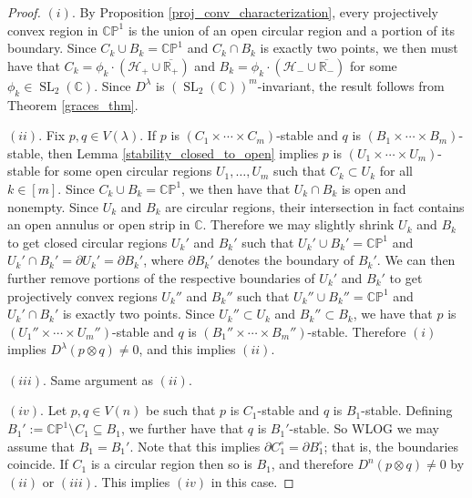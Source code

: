 \documentclass{article}
\theoremstyle{definition}
\theoremstyle{plain}
\newcommand{\C}{\mathbb{C}}
\newcommand{\R}{\mathbb{R}}
\newcommand{\CP}{\mathbb{CP}}
\newcommand{\UHP}{\mathcal{H}_+}
\newcommand{\LHP}{\mathcal{H}_-}
\DeclareMathOperator{\SL}{SL}
\begin{document}
\begin{proof}
    $(i)$. By Proposition \ref{proj_conv_characterization}, every projectively convex region in $\CP^1$ is the union of an open circular region and a portion of its boundary. Since $C_k \cup B_k = \CP^1$ and $C_k \cap B_k$ is exactly two points, we then must have that $C_k = \phi_k \cdot (\UHP \cup \overline{\R_+})$ and $B_k = \phi_k \cdot (\LHP \cup \overline{\R_-})$ for some $\phi_k \in \SL_2(\C)$. Since $D^\lambda$ is $(\SL_2(\C))^m$-invariant, the result follows from Theorem \ref{graces_thm}.
    
    $(ii)$. Fix $p,q \in V(\lambda)$. If $p$ is $(C_1 \times \cdots \times C_m)$-stable and $q$ is $(B_1 \times \cdots \times B_m)$-stable, then Lemma \ref{stability_closed_to_open} implies $p$ is $(U_1 \times \cdots \times U_m)$-stable for some open circular regions $U_1,\ldots,U_m$ such that $C_k \subset U_k$ for all $k \in [m]$. Since $C_k \cup B_k = \CP^1$, we then have that $U_k \cap B_k$ is open and nonempty. Since $U_k$ and $B_k$ are circular regions, their intersection in fact contains an open annulus or open strip in $\C$. Therefore we may slightly shrink $U_k$ and $B_k$ to get closed circular regions $U_k'$ and $B_k'$ such that $U_k' \cup B_k' = \CP^1$ and $U_k' \cap B_k' = \partial U_k' = \partial B_k'$, where $\partial B_k'$ denotes the boundary of $B_k'$. We can then further remove portions of the respective boundaries of $U_k'$ and $B_k'$ to get projectively convex regions $U_k''$ and $B_k''$ such that $U_k'' \cup B_k'' = \CP^1$ and $U_k' \cap B_k'$ is exactly two points. Since $U_k'' \subset U_k$ and $B_k'' \subset B_k$, we have that $p$ is $(U_1'' \times \cdots \times U_m'')$-stable and $q$ is $(B_1'' \times \cdots \times B_m'')$-stable. Therefore $(i)$ implies $D^\lambda(p \otimes q) \neq 0$, and this implies $(ii)$.

    $(iii)$. Same argument as $(ii)$.
    
    $(iv)$. Let $p,q \in V(n)$ be such that $p$ is $C_1$-stable and $q$ is $B_1$-stable. Defining $B_1' := \CP^1 \setminus C_1 \subseteq B_1$, we further have that $q$ is $B_1'$-stable. So WLOG we may assume that $B_1 = B_1'$. Note that this implies $\partial C_1^\circ = \partial B_1^\circ$; that is, the boundaries coincide. If $C_1$ is a circular region then so is $B_1$, and therefore $D^n(p \otimes q) \neq 0$ by $(ii)$ or $(iii)$. This implies $(iv)$ in this case.
    

\end{proof}
\end{document}
